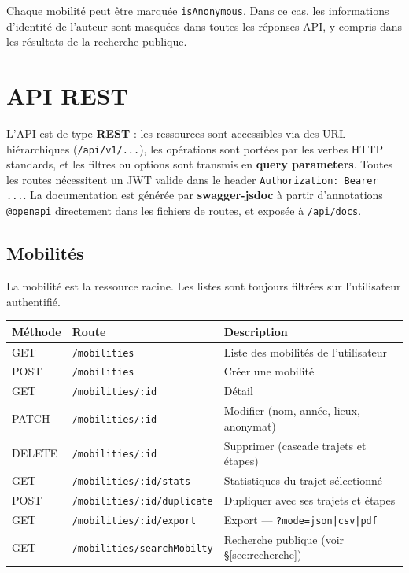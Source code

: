 \documentclass[11pt,a4paper]{article}
\begin{document}
Chaque mobilité peut être marquée \texttt{isAnonymous}. Dans ce cas, les informations d'identité de l'auteur sont masquées dans toutes les réponses API, y compris dans les résultats de la recherche publique.

\section{API REST}

L'API est de type \textbf{REST} : les ressources sont accessibles via des URL hiérarchiques (\texttt{/api/v1/...}), les opérations sont portées par les verbes HTTP standards, et les filtres ou options sont transmis en \textbf{query parameters}. Toutes les routes nécessitent un JWT valide dans le header \texttt{Authorization: Bearer ...}. La documentation est générée par \textbf{swagger-jsdoc} à partir d'annotations \texttt{@openapi} directement dans les fichiers de routes, et exposée à \texttt{/api/docs}.

\subsection{Mobilités}

La mobilité est la ressource racine. Les listes sont toujours filtrées sur l'utilisateur authentifié.

\begin{center}
\begin{tabularx}{\linewidth}{llX}
\toprule
\textbf{Méthode} & \textbf{Route} & \textbf{Description} \\
\midrule
GET    & \texttt{/mobilities}               & Liste des mobilités de l'utilisateur \\
POST   & \texttt{/mobilities}               & Créer une mobilité \\
GET    & \texttt{/mobilities/:id}           & Détail \\
PATCH  & \texttt{/mobilities/:id}           & Modifier (nom, année, lieux, anonymat) \\
DELETE & \texttt{/mobilities/:id}           & Supprimer (cascade trajets et étapes) \\
GET    & \texttt{/mobilities/:id/stats}     & Statistiques du trajet sélectionné \\
POST   & \texttt{/mobilities/:id/duplicate} & Dupliquer avec ses trajets et étapes \\
GET    & \texttt{/mobilities/:id/export}    & Export — \texttt{?mode=json|csv|pdf} \\
GET    & \texttt{/mobilities/searchMobilty} & Recherche publique (voir §\ref{sec:recherche}) \\
\bottomrule
\end{tabularx}
\end{center}
\end{document}
